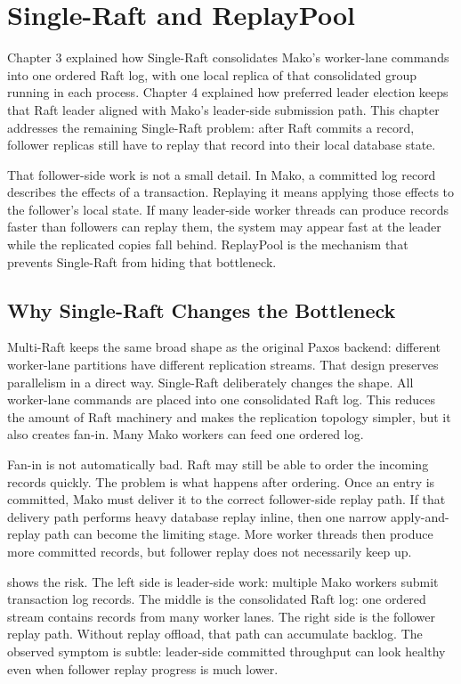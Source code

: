 \chapter{Single-Raft and ReplayPool}

Chapter 3 explained how Single-Raft consolidates Mako's worker-lane commands
into one ordered Raft log, with one local replica of that consolidated group
running in each process. Chapter 4 explained how preferred leader election
keeps that Raft leader aligned with Mako's leader-side submission path. This
chapter addresses the remaining Single-Raft problem: after Raft commits a
record, follower replicas still have to replay that record into their local
database state.

That follower-side work is not a small detail. In Mako, a committed log record
describes the effects of a transaction. Replaying it means applying those
effects to the follower's local state. If many leader-side worker threads can
produce records faster than followers can replay them, the system may appear
fast at the leader while the replicated copies fall behind. ReplayPool is the
mechanism that prevents Single-Raft from hiding that bottleneck.

\section{Why Single-Raft Changes the Bottleneck}

Multi-Raft keeps the same broad shape as the original Paxos backend: different
worker-lane partitions have different replication streams. That design
preserves parallelism in a direct way. Single-Raft deliberately changes the
shape. All worker-lane commands are placed into one consolidated Raft log. This
reduces the amount of Raft machinery and makes the replication topology
simpler, but it also creates fan-in. Many Mako workers can feed one ordered
log.

Fan-in is not automatically bad. Raft may still be able to order the incoming
records quickly. The problem is what happens after ordering. Once an entry is
committed, Mako must deliver it to the correct follower-side replay path. If
that delivery path performs heavy database replay inline, then one narrow
apply-and-replay path can become the limiting stage. More worker threads then
produce more committed records, but follower replay does not necessarily keep
up.

 shows the risk. The left side is
leader-side work: multiple Mako workers submit transaction log records. The
middle is the consolidated Raft log: one ordered stream contains records from
many worker lanes. The right side is the follower replay path. Without replay
offload, that path can accumulate backlog. The observed symptom is subtle:
leader-side committed throughput can look healthy even when follower replay
progress is much lower.

